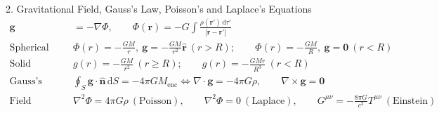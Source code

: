 \documentclass[11pt,a4paper,openany,oneside]{book}
\newcommand{\vect}[1]{\mathbf{#1}}
\newcommand{\uv}[1]{\hat{\mathbf{#1}}}
\newcommand{\dd}{\,\mathrm{d}}
\numberwithin{equation}{chapter}
\begin{document}
\begin{fs}{2. Gravitational Field, Gauss's Law, Poisson's and Laplace's Equations}
\begin{align*}
  \vect{g} &= -\nabla\Phi, \qquad \Phi(\vect{r}) = -G\int\frac{\rho(\vect{r}')\dd\tau'}{|\vect{r}-\vect{r}'|}\\
  \text{Spherical Shell:}\quad & \Phi(r) = -\frac{GM}{r},\ \vect{g} = -\frac{GM}{r^2}\uv{r}\ (r > R); \qquad \Phi(r) = -\frac{GM}{R},\ \vect{g} = \vect{0}\ (r < R)\\
  \text{Solid Sphere:}\quad & g(r) = -\frac{GM}{r^2}\ (r \ge R); \qquad g(r) = -\frac{GMr}{R^3}\ (r < R)\\
  \text{Gauss's Law:}\quad & \oint_S\vect{g}\cdot\uv{n}\dd S = -4\pi GM_{\text{enc}} \iff \nabla\cdot\vect{g} = -4\pi G\rho, \qquad \nabla\times\vect{g} = \vect{0}\\
  \text{Field Equations:}\quad & \nabla^2\Phi = 4\pi G\rho\ (\text{Poisson}), \qquad \nabla^2\Phi = 0\ (\text{Laplace}), \qquad G^{\mu\nu} = -\frac{8\pi G}{c^2}T^{\mu\nu}\ (\text{Einstein})
\end{align*}
\end{fs}
\end{document}

